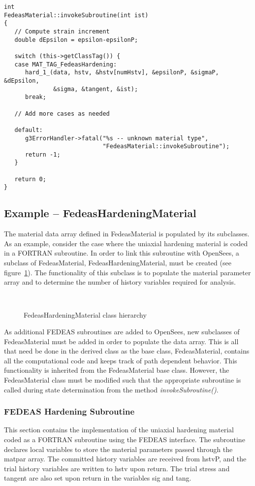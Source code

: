 \documentclass[12pt]{article}
\begin{document}
{\sf\small
\begin{verbatim}
int
FedeasMaterial::invokeSubroutine(int ist)
{
   // Compute strain increment
   double dEpsilon = epsilon-epsilonP;
     
   switch (this->getClassTag()) {
   case MAT_TAG_FedeasHardening:
      hard_1_(data, hstv, &hstv[numHstv], &epsilonP, &sigmaP, &dEpsilon, 
              &sigma, &tangent, &ist);
      break;
       
   // Add more cases as needed

   default:
      g3ErrorHandler->fatal("%s -- unknown material type",
                            "FedeasMaterial::invokeSubroutine");
      return -1;
   }
     
   return 0;
}
\end{verbatim}
}

\subsection{Example -- FedeasHardeningMaterial}
The material data array defined in FedeasMaterial is populated by its subclasses.
As an example, consider the case where the uniaxial hardening material is
coded in a FORTRAN subroutine. In order to link this subroutine with OpenSees, a
subclass of FedeasMaterial, FedeasHardeningMaterial, must be created
(see figure~\ref{fig:FedeasHardening}). The functionality
of this subclass is to populate the material parameter array and to determine the
number of history variables required for analysis.

\begin{figure}[htpb]
\begin{center}
\leavevmode
\hbox{%
}
\end{center}
\caption{FedeasHardeningMaterial class hierarchy}
\label{fig:FedeasHardening}
\end{figure}

As additional FEDEAS subroutines are added to OpenSees, new subclasses of FedeasMaterial
must be added in order to populate the data array. This is all that need
be done in the derived class as the base class, FedeasMaterial, contains all the 
computational code and keeps track of path dependent behavior. This functionality is
inherited from the FedeasMaterial base class. However, the FedeasMaterial class 
must be modified such that the appropriate
subroutine is called during state determination from the method {\em invokeSubroutine()}.

\subsubsection{FEDEAS Hardening Subroutine}
This section contains the implementation of the uniaxial hardening material coded as a
FORTRAN subroutine using the FEDEAS interface. The subroutine declares local variables
to store the material parameters passed through the matpar array. The committed history
variables are received from hstvP, and the trial history variables are written to hstv
upon return. The trial stress and tangent are also set upon return in the variables
sig and tang.
\end{document}
